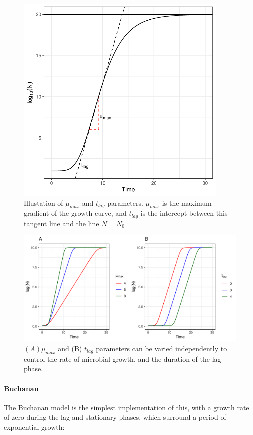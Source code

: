 \documentclass[11pt, a4paper]{article}
\begin{document}
\begin{linenumbers}
        \begin{figure}[H]
        \centering
        \includegraphics[width=4in]{../results/4_param_demo.pdf}
        \caption{Illustation of $\mu_{max}$ and $t_{lag}$ parameters. $\mu_{max}$ is the maximum gradient of the growth curve, and $t_{lag}$ is the intercept between this tangent line and the line $N = N_0$}
        \label{fig:4_param_demo}
        \end{figure}


        \begin{figure}[H]
        \includegraphics[width=\linewidth]{../results/tlag_rmax_demo.pdf}
        \caption{ $(A)\mu_{max}$ and (B) $t_{lag}$ parameters can be varied independently to control the rate of microbial growth, and the duration of the lag phase.}
        \label{fig:parameter_variation_demo}
        \end{figure}



\paragraph{Buchanan}
The Buchanan model \cite{Buchanan} is the simplest implementation of this, with a growth rate of zero during the lag and stationary phases, which surround a period of exponential growth:


\end{linenumbers}
\end{document}
